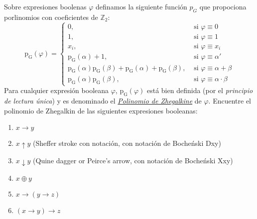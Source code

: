   \begin{exercise}
    \label{ex:Zhegalkine}
    Sobre expresiones boolenas $\varphi$ definamos la siguiente
    función $p_{G}$ que propociona porlinomios con coeficientes de
    $\mathbb{Z}_{2}$:
    \begin{equation*}
      \operatorname{p_{G}}(\varphi)=
      \begin{cases}
        0,&\text{ si }\varphi\equiv 0\\
        1,&\text{ si }\varphi\equiv 1\\
        x_{i},&\text{ si }\varphi\equiv x_{i}\\
        \operatorname{p_{G}}(\alpha)+1,
        &\text{ si }\varphi\equiv\alpha'\\
        \operatorname{p_{G}}(\alpha)\operatorname{p_{G}}(\beta)
        +\operatorname{p_{G}}(\alpha)
        +\operatorname{p_{G}}(\beta),&\text{ si }\varphi\equiv\alpha+\beta\\
        \operatorname{p_{G}}(\alpha)\operatorname{p_{G}}(\beta),
        &\text{ si }\varphi\equiv\alpha\cdot\beta
      \end{cases}
    \end{equation*}
    Para cualquier expresión booleana $\varphi$,
    $\operatorname{p_{G}}(\varphi)$ está bien definida (por el
    \textit{principio de lectura única}) y es denominado el
    \href{https://en.wikipedia.org/wiki/Ivan_Ivanovich_Zhegalkin}{\textit{Polinomio
        de Zhegalkine}} de $\varphi$. Encuentre el polinomio de
    Zhegalkin de las siguientes expresiones booleanas:
    \begin{enumerate}
    \item $x\to y$
    \item $x\uparrow y$ (Sheffer stroke con notación, con notación de Bocheński Dxy)
    \item $x\downarrow y$ (Quine dagger or Peirce's arrow, con notación de Bocheński Xxy)
    \item $x\oplus y$
    \item $x\to(y\to z)$
    \item $(x\to y)\to z$
    \end{enumerate}
  \end{exercise}
